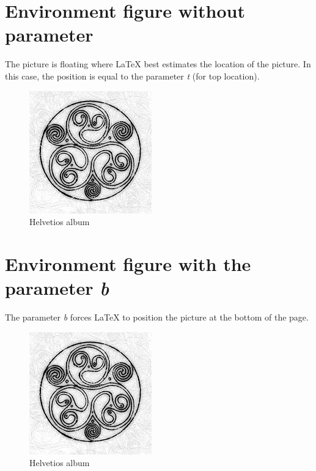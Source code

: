 \documentclass{article}
\begin{document}
	
	
\section*{Environment figure without parameter}

The picture is floating where \LaTeX{} best estimates the location of the picture. In this case, the position is equal to the parameter \emph{t} (for top location).

\begin{figure}
\centering
\includegraphics[scale=0.5]{helvetios}
\caption{Helvetios album}
\end{figure}

\clearpage

\section*{Environment figure with the parameter \emph{b}}

The parameter \emph{b} forces \LaTeX{} to position the picture at the bottom of the page.

\begin{figure}[b]
	\centering
	\includegraphics[scale=0.5]{helvetios}
	\caption{Helvetios album}
\end{figure}
\end{document}
